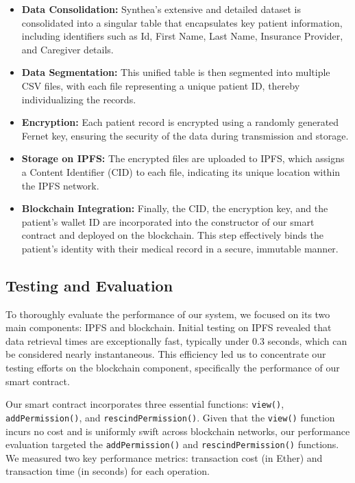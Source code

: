 \documentclass[12pt]{report}
\begin{document}
\begin{itemize}
\item \textbf{Data Consolidation:} Synthea's extensive and detailed dataset is consolidated into a singular table that encapsulates key patient information, including identifiers such as Id, First Name, Last Name, Insurance Provider, and Caregiver details.

\item \textbf{Data Segmentation:} This unified table is then segmented into multiple CSV files, with each file representing a unique patient ID, thereby individualizing the records.

\item \textbf{Encryption:} Each patient record is encrypted using a randomly generated Fernet key, ensuring the security of the data during transmission and storage.

\item \textbf{Storage on IPFS:} The encrypted files are uploaded to IPFS, which assigns a Content Identifier (CID) to each file, indicating its unique location within the IPFS network.

\item \textbf{Blockchain Integration:} Finally, the CID, the encryption key, and the patient's wallet ID are incorporated into the constructor of our smart contract and deployed on the blockchain. This step effectively binds the patient's identity with their medical record in a secure, immutable manner.
\end{itemize}


\subsection{Testing and Evaluation}

To thoroughly evaluate the performance of our system, we focused on its two main components: IPFS and blockchain. Initial testing on IPFS revealed that data retrieval times are exceptionally fast, typically under 0.3 seconds, which can be considered nearly instantaneous. This efficiency led us to concentrate our testing efforts on the blockchain component, specifically the performance of our smart contract.

Our smart contract incorporates three essential functions: \texttt{view()}, \texttt{addPermission()}, and \texttt{rescindPermission()}. Given that the \texttt{view()} function incurs no cost and is uniformly swift across blockchain networks, our performance evaluation targeted the \texttt{addPermission()} and \texttt{rescindPermission()} functions. We measured two key performance metrics: transaction cost (in Ether) and transaction time (in seconds) for each operation.
\end{document}

